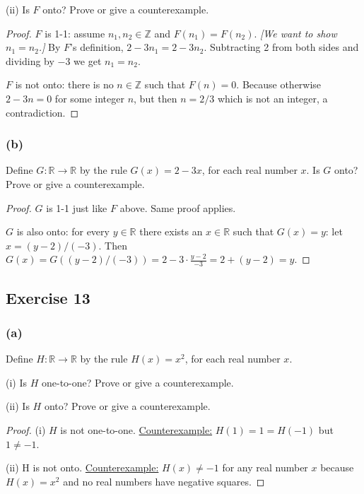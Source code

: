 \documentclass[14pt]{extarticle}
\newcommand{\dps}{\displaystyle}
\newcommand{\R}{\mathbb{R}}
\newcommand{\Z}{\mathbb{Z}}
\begin{document}
(ii) Is $F$ onto? Prove or give a counterexample.

\begin{proof}
    $F$ is 1-1: assume \(n_1, n_2 \in \Z\) and \(F(n_1) = F(n_2)\). {\it [We want to show \(n_1 = n_2\).]} By $F$'s
    definition, \(2 - 3n_1 = 2-3n_2\). Subtracting 2 from both sides and dividing by $-3$ we get \(n_1 = n_2\).

    $F$ is not onto: there is no \(n \in \Z\) such that \(F(n) = 0\). Because otherwise \(2 - 3n = 0\) for some integer
    $n$, but then \(n = 2/3\) which is not an integer, a contradiction.
\end{proof}

\subsubsection{(b)}
Define \(G: \R \to \R\) by the rule \(G(x) = 2 - 3x\), for each real number $x$. Is $G$ onto? Prove or give a counterexample.

\begin{proof}
    $G$ is 1-1 just like $F$ above. Same proof applies.

    $G$ is also onto: for every $y \in \R$ there exists an $x \in \R$ such that $G(x) = y$: let \(x = (y - 2) / (-3)\).
    Then \(\dps G(x) = G((y - 2) / (-3)) = 2 - 3 \cdot \frac{y-2}{-3} = 2 + (y-2) = y\).
\end{proof}

\subsection{Exercise 13}
\subsubsection{(a)}
Define \(H: \R \to \R\) by the rule \(H(x) = x^2\), for each real number $x$.

(i) Is $H$ one-to-one? Prove or give a counterexample.

(ii) Is $H$ onto? Prove or give a counterexample.

\begin{proof}
    (i) $H$ is not one-to-one. \underline{Counterexample:} \(H(1) = 1 = H(-1)\) but \(1 \neq -1\).

    (ii) H is not onto. \underline{Counterexample:} \(H(x) \neq -1\) for any real number $x$ because \(H(x) = x^2\) and no
    real numbers have negative squares.
\end{proof}
\end{document}
